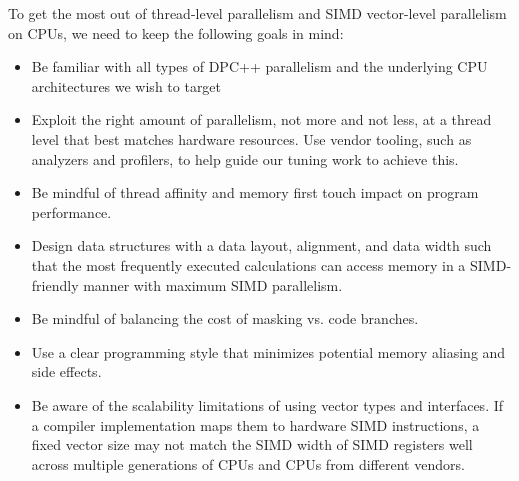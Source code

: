 To get the most out of thread-level parallelism and SIMD vector-level parallelism on CPUs, we need to keep the following goals in mind:\par

\begin{itemize}
	\item Be familiar with all types of DPC++ parallelism and the 	underlying CPU architectures we wish to target
	\item Exploit the right amount of parallelism, not more and not less, at a thread level that best matches hardware resources. Use vendor tooling, such as analyzers and profilers, to help guide our tuning work to achieve this.
	\item Be mindful of thread affinity and memory first touch impact on program performance.
	\item Design data structures with a data layout, alignment, and data width such that the most frequently executed calculations can access memory in a SIMD-friendly manner with maximum SIMD parallelism.
	\item Be mindful of balancing the cost of masking vs. code branches.
	\item Use a clear programming style that minimizes potential memory aliasing and side effects.
	\item Be aware of the scalability limitations of using vector types and interfaces. If a compiler implementation maps them to hardware SIMD instructions, a fixed vector size may not match the SIMD width of SIMD registers well across multiple generations of CPUs and 
	CPUs from different vendors.
\end{itemize}






\newpage